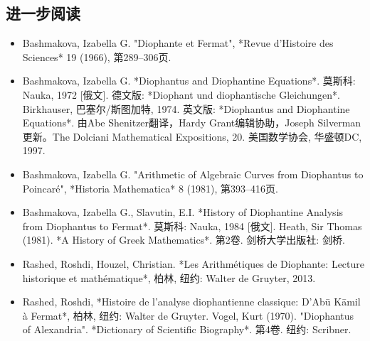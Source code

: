 \subsection{进一步阅读}
\begin{itemize}
\item Bashmakova, Izabella G. "Diophante et Fermat", *Revue d'Histoire des Sciences* 19 (1966), 第289–306页.  
\item Bashmakova, Izabella G. *Diophantus and Diophantine Equations*. 莫斯科: Nauka, 1972 [俄文]. 德文版: *Diophant und diophantische Gleichungen*. Birkhauser, 巴塞尔/斯图加特, 1974. 英文版: *Diophantus and Diophantine Equations*. 由Abe Shenitzer翻译，Hardy Grant编辑协助，Joseph Silverman更新。The Dolciani Mathematical Expositions, 20. 美国数学协会, 华盛顿DC, 1997.  
\item Bashmakova, Izabella G. "Arithmetic of Algebraic Curves from Diophantus to Poincaré", *Historia Mathematica* 8 (1981), 第393–416页.  
\item Bashmakova, Izabella G., Slavutin, E.I. *History of Diophantine Analysis from Diophantus to Fermat*. 莫斯科: Nauka, 1984 [俄文].  
Heath, Sir Thomas (1981). *A History of Greek Mathematics*. 第2卷. 剑桥大学出版社: 剑桥.  
\item Rashed, Roshdi, Houzel, Christian. *Les Arithmétiques de Diophante: Lecture historique et mathématique*, 柏林, 纽约: Walter de Gruyter, 2013.  
\item Rashed, Roshdi, *Histoire de l’analyse diophantienne classique: D’Abū Kāmil à Fermat*, 柏林, 纽约: Walter de Gruyter.  
Vogel, Kurt (1970). "Diophantus of Alexandria". *Dictionary of Scientific Biography*. 第4卷. 纽约: Scribner.
\end{itemize}